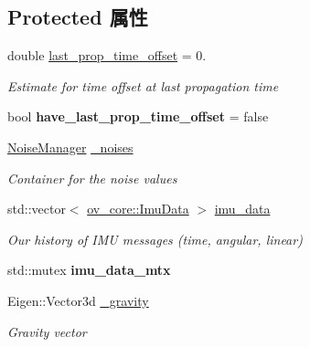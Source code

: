\subsection*{Protected 属性}
\begin{DoxyCompactItemize}
\item 
\mbox{\label{classov__msckf_1_1Propagator_a2199da5257d46ee711371550c734dc9a}} 
double \hyperlink{classov__msckf_1_1Propagator_a2199da5257d46ee711371550c734dc9a}{last\+\_\+prop\+\_\+time\+\_\+offset} = 0.
\begin{DoxyCompactList}\small\item\em Estimate for time offset at last propagation time \end{DoxyCompactList}\item 
\mbox{\label{classov__msckf_1_1Propagator_a7affb32669bf959625b65fb80a9af6a2}} 
bool {\bfseries have\+\_\+last\+\_\+prop\+\_\+time\+\_\+offset} = false
\item 
\mbox{\label{classov__msckf_1_1Propagator_a3f19a5f9fdb86733cfb0dcc040313f38}} 
\hyperlink{structov__msckf_1_1NoiseManager}{Noise\+Manager} \hyperlink{classov__msckf_1_1Propagator_a3f19a5f9fdb86733cfb0dcc040313f38}{\+\_\+noises}
\begin{DoxyCompactList}\small\item\em Container for the noise values \end{DoxyCompactList}\item 
\mbox{\label{classov__msckf_1_1Propagator_aa1639a14dc1149d2e47be177bf33b572}} 
std\+::vector$<$ \hyperlink{structov__core_1_1ImuData}{ov\+\_\+core\+::\+Imu\+Data} $>$ \hyperlink{classov__msckf_1_1Propagator_aa1639a14dc1149d2e47be177bf33b572}{imu\+\_\+data}
\begin{DoxyCompactList}\small\item\em Our history of I\+MU messages (time, angular, linear) \end{DoxyCompactList}\item 
\mbox{\label{classov__msckf_1_1Propagator_a9495dd802925abfde162f280f8f9d325}} 
std\+::mutex {\bfseries imu\+\_\+data\+\_\+mtx}
\item 
\mbox{\label{classov__msckf_1_1Propagator_a6a5ea009315ab578b48f079d502f97ab}} 
Eigen\+::\+Vector3d \hyperlink{classov__msckf_1_1Propagator_a6a5ea009315ab578b48f079d502f97ab}{\+\_\+gravity}
\begin{DoxyCompactList}\small\item\em Gravity vector \end{DoxyCompactList}\end{DoxyCompactItemize}


